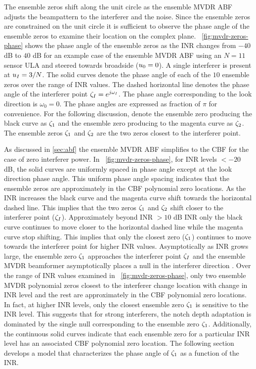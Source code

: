 The ensemble zeros shift along the unit circle as the ensemble MVDR
ABF adjusts the beampattern to the interferer and the noise. Since the
ensemble zeros are constrained on the unit circle it is sufficient to
observe the phase angle of the ensemble zeros to examine their
location on the complex
plane. \figurename{}~\ref{fig:mvdr-zeros-phase} shows the phase angle
of the ensemble zeros as the INR changes from $-40$ dB to $40$ dB for
an example case of the ensemble MVDR ABF using an $N = 11$ sensor ULA
and steered towards broadside ($u_0 = 0$). A single interferer is
present at $u_I = 3/N$. The solid curves denote the phase angle of
each of the $10$ ensemble zeros over the range of INR values. The
dashed horizontal line denotes the phase angle of the interferer point
$\zeta_I = e^{j\omega_I}$. The phase angle corresponding to the
look direction is $\omega_0 = 0$. The phase angles are expressed as
fraction of $\pi$ for convenience. For the following discussion,
denote the ensemble zero producing the black curve as $\zeta_1$ and
the ensemble zero producing to the magenta curve as $\zeta_2$. The
ensemble zeros $\zeta_1$ and $\zeta_2$ are the two zeros closest to
the interferer point.

As discussed in \sect{}\ref{sec:abf} the ensemble MVDR ABF simplifies
to the CBF for the case of zero interferer power. In
\figurename{}~\ref{fig:mvdr-zeros-phase}, for INR levels $< -20$ dB,
the solid curves are uniformly spaced in phase angle except at the
look direction phase angle. This uniform phase angle spacing indicates
that the ensemble zeros are approximately in the CBF polynomial zero
locations. As the INR increases the black curve and the magenta curve
shift towards the horizontal dashed line. This implies that the two
zeros $\zeta_1$ and $\zeta_2$ shift closer to the interferer point
($\zeta_I$). Approximately beyond INR $> 10$ dB INR only the black
curve continues to move closer to the horizontal dashed line while the
magenta curve stop shifting. This implies that only the closest zero
($\zeta_1$) continues to move towards the interferer point for higher
INR values. Asymptotically as INR grows large, the ensemble zero
$\zeta_1$ approaches the interferer point $\zeta_I$ and the ensemble
MVDR beamformer asymptotically places a null in the interferer
direction \cite{vtree2002oap}. Over the range of INR values examined
in \figurename{}~\ref{fig:mvdr-zeros-phase}, only two ensemble MVDR
polynomial zeros closest to the interferer change location with change
in INR level and the rest are approximately in the CBF polynomial zero
locations. In fact, at higher INR levels, only the closest ensemble
zero $\zeta_1$ is sensitive to the INR level. This suggests that for
strong interferers, the notch depth adaptation is dominated by the
single null corresponding to the ensemble zero
$\zeta_1$. Additionally, the continuous solid curves indicate that
each ensemble zero for a particular INR level has an associated CBF
polynomial zero location. The following section develops a model that
characterizes the phase angle of $\zeta_1$ as a function of the INR.

